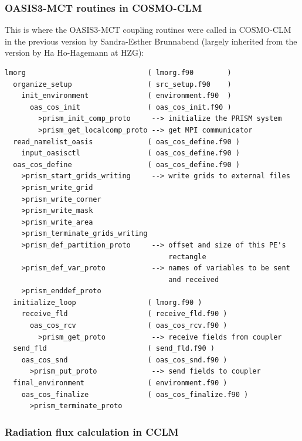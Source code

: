 \documentclass[a4paper,titlepage]{scrartcl}
\begin{document}
\subsubsection{OASIS3-MCT routines in COSMO-CLM}
This is where the OASIS3-MCT coupling routines were called in COSMO-CLM in the previous version by Sandra-Esther Brunnabend (largely inherited from the version by Ha Ho-Hagemann at HZG):
\begin{verbatim}
lmorg                             ( lmorg.f90        )
  organize_setup                  ( src_setup.f90    )
    init_environment              ( environment.f90  )
      oas_cos_init                ( oas_cos_init.f90 )
        >prism_init_comp_proto     --> initialize the PRISM system
        >prism_get_localcomp_proto --> get MPI communicator 
  read_namelist_oasis             ( oas_cos_define.f90 )
    input_oasisctl                ( oas_cos_define.f90 )
  oas_cos_define                  ( oas_cos_define.f90 )
    >prism_start_grids_writing     --> write grids to external files
    >prism_write_grid
    >prism_write_corner
    >prism_write_mask
    >prism_write_area
    >prism_terminate_grids_writing
    >prism_def_partition_proto     --> offset and size of this PE's 
                                       rectangle
    >prism_def_var_proto           --> names of variables to be sent 
                                       and received
    >prism_enddef_proto
  initialize_loop                 ( lmorg.f90 )
    receive_fld                   ( receive_fld.f90 )
      oas_cos_rcv                 ( oas_cos_rcv.f90 )
        >prism_get_proto           --> receive fields from coupler
  send_fld                        ( send_fld.f90 )
    oas_cos_snd                   ( oas_cos_snd.f90 )
      >prism_put_proto             --> send fields to coupler
  final_environment               ( environment.f90 )
    oas_cos_finalize              ( oas_cos_finalize.f90 )
      >prism_terminate_proto
\end{verbatim}

\subsubsection{Radiation flux calculation in CCLM}
\end{document}
